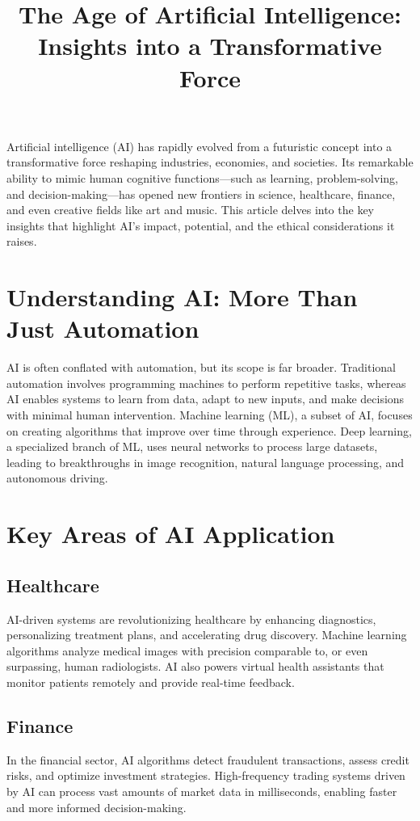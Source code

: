 \documentclass{article}
\title{The Age of Artificial Intelligence: Insights into a Transformative Force}
\author{}
\date{}
\begin{document}
\maketitle

Artificial intelligence (AI) has rapidly evolved from a futuristic concept into a transformative force reshaping industries, economies, and societies. Its remarkable ability to mimic human cognitive functions---such as learning, problem-solving, and decision-making---has opened new frontiers in science, healthcare, finance, and even creative fields like art and music. This article delves into the key insights that highlight AI's impact, potential, and the ethical considerations it raises.

\section{Understanding AI: More Than Just Automation}
AI is often conflated with automation, but its scope is far broader. Traditional automation involves programming machines to perform repetitive tasks, whereas AI enables systems to learn from data, adapt to new inputs, and make decisions with minimal human intervention. Machine learning (ML), a subset of AI, focuses on creating algorithms that improve over time through experience. Deep learning, a specialized branch of ML, uses neural networks to process large datasets, leading to breakthroughs in image recognition, natural language processing, and autonomous driving.

\section{Key Areas of AI Application}

\subsection{Healthcare}
AI-driven systems are revolutionizing healthcare by enhancing diagnostics, personalizing treatment plans, and accelerating drug discovery. Machine learning algorithms analyze medical images with precision comparable to, or even surpassing, human radiologists. AI also powers virtual health assistants that monitor patients remotely and provide real-time feedback.

\subsection{Finance}
In the financial sector, AI algorithms detect fraudulent transactions, assess credit risks, and optimize investment strategies. High-frequency trading systems driven by AI can process vast amounts of market data in milliseconds, enabling faster and more informed decision-making.
\end{document}
